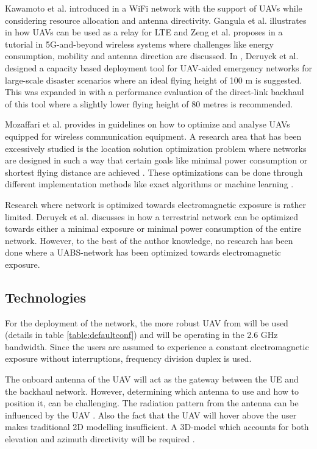\documentclass[twocolumn]{phdsymp} %
\begin{document}
Kawamoto et al. introduced in \cite{U11} a WiFi network with the support of  \gls{UAV}s while considering resource allocation 
and antenna directivity. 
Gangula et al. illustrates in \cite{U10} how \gls{UAV}s can be used as a relay for \gls{LTE}
and
Zeng et al. proposes in  \cite{U12} a tutorial in 5G-and-beyond wireless systems where challenges like 
energy consumption, mobility and antenna direction are discussed. 
In \cite{J2}, Deruyck et al. designed  a capacity based deployment tool for UAV-aided emergency
networks for large-scale disaster scenarios where an ideal flying height of 100 m is suggested. This was expanded 
in \cite{U1} with a performance evaluation of the direct-link backhaul of this tool where a slightly lower 
flying height of 80 metres is recommended.

Mozaffari et al. provides in \cite{U3} guidelines on how to optimize and analyse \gls{UAV}s equipped for 
wireless communication equipment.
A research area that has been excessively studied is the location solution optimization problem where networks are 
designed in such a way that certain goals like minimal power consumption or shortest flying distance are achieved \cite{U6,U7,U8,U9}.
These optimizations can be done through different implementation methods like exact algorithms or machine learning \cite{U3,U5}.

Research where network is optimized towards electromagnetic exposure is rather limited.
Deruyck et al. discusses in \cite{J1} how a terrestrial network can be optimized towards either a minimal exposure or minimal power consumption of the entire network.
However, to the best of the author knowledge, no research has been done where a \gls{UABS}-network has been optimized towards electromagnetic exposure.

\subsection{Technologies}
For the deployment of the network, the more robust \gls{UAV} from \cite{J2} will be used (details in table \ref{table:defaultconf}) and will be operating in the 2.6 GHz 
bandwidth. Since the users are assumed to experience a constant electromagnetic exposure without interruptions, frequency division duplex is used.

The onboard antenna of the \gls{UAV} will act as the gateway between the UE and the backhaul network.
However, determining which antenna to use and how to position it, can be challenging.
The radiation pattern from the antenna can be influenced by the \gls{UAV} \cite{A1}.
Also the fact that the \gls{UAV} will hover above the user makes traditional 2D modelling insufficient.
A 3D-model which accounts for both elevation and azimuth directivity 
will be required \cite{U12}.
\end{document}

